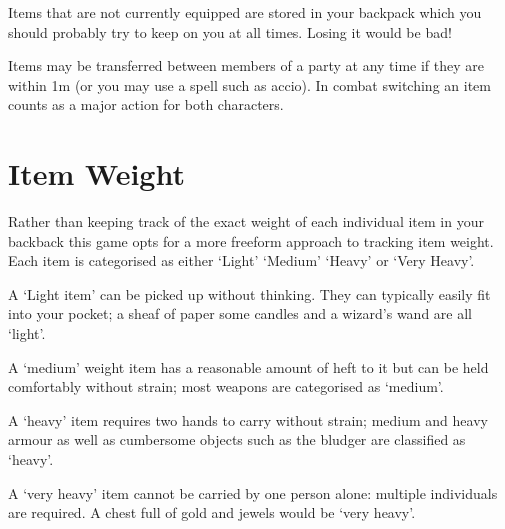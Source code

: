 Items that are not currently equipped are stored in your backpack\comma{} which you should probably try to keep on you at all times. Losing it would be bad!

Items may be transferred between members of a party at any time\comma{} if they are within 1m (or you may use a spell such as accio). In combat\comma{} switching an item counts as a major action for both characters. 



\section{Item Weight}

Rather than keeping track of the exact weight of each individual item in your backback\comma{} this game opts for a more free\minus{}form approach to tracking item weight. Each item is categorised as either `Light'\comma{} `Medium'\comma{} `Heavy' or `Very Heavy'. 

A `Light item' can be picked up without thinking. They can typically easily fit into your pocket; a sheaf of paper\comma{} some candles and a wizard's wand are all `light'. 

A `medium' weight item has a reasonable amount of heft to it\comma{} but can be held comfortably without strain; most weapons are categorised as `medium'. 

A `heavy' item requires two hands to carry without strain; medium and heavy armour\comma{} as well as cumbersome objects such as the bludger are classified as `heavy'.

A `very heavy' item cannot be carried by one person alone: multiple individuals are required. A chest full of gold and jewels would be `very heavy'. 
